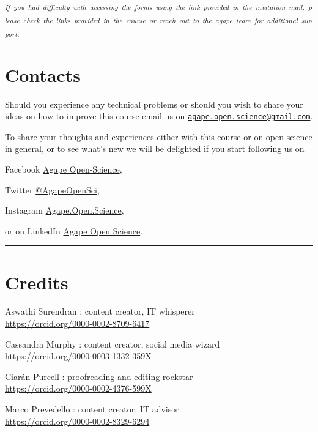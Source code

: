 \documentclass[
]{book}
\begin{document}
\textsubscript{\emph{If~you~had~difficulty~with~accessing~the~forms~using~the~link~provided~in~the~invitation~mail,~please~check~the~links~provided~in~the~course~or~reach~out~to~the~agape~team~for~additional~support.}}

\hypertarget{contacts}{%
\section*{Contacts}\label{contacts}}

Should you experience any technical problems or should you wish to share your ideas on how to improve this course email us on {\href{mailto:agape.open.science@gmail.com}{\nolinkurl{agape.open.science@gmail.com}}}.

To share your thoughts and experiences either with this course or on open science in general, or to see what's new we will be delighted if you start following us on

Facebook {\href{https://facebook.com/AgapeOpen-Science}{Agape Open-Science}},

Twitter {\href{https://twitter.com/AgapeOpenSci}{@AgapeOpenSci}},

Instagram {\href{https://www.instagram.com/Agape.Open.Science}{Agape.Open.Science}},

or on LinkedIn {\href{https://www.linkedin.com/company/agape-open-science/}{Agape Open Science}}.

\begin{center}\rule{0.5\linewidth}{0.5pt}\end{center}

\hypertarget{credits}{%
\section*{Credits}\label{credits}}

Aswathi Surendran : content creator, IT whisperer\\
\url{https://orcid.org/0000-0002-8709-6417}

Cassandra Murphy : content creator, social media wizard\\
\url{https://orcid.org/0000-0003-1332-359X}

Ciarán Purcell : proofreading and editing rockstar\\
\url{https://orcid.org/0000-0002-4376-599X}

Marco Prevedello : content creator, IT advisor ~\\
\url{https://orcid.org/0000-0002-8329-6294}
\end{document}
